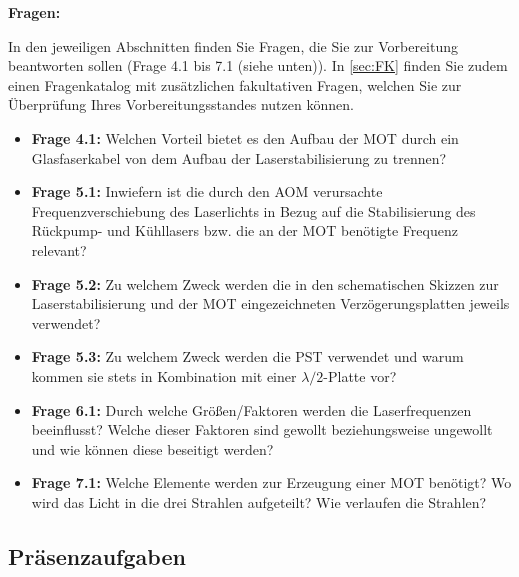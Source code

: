 \documentclass[
class=book,
accentcolor=1b,
custommargins=geometry,
fontsize=11pt,
thesis={type=Versuchsanleitung},
ruledheaders=all,
headline=false,
instbox=false,
marginpar=false,
title=small,
ignore-missing-data=true,
twoside=false,
logofile=apqdesign/tuda_logo.pdf,
pdfa=false %
]{apqpub}
\begin{document}
\textbf{Fragen:}  

In den jeweiligen Abschnitten finden Sie Fragen, die Sie zur Vorbereitung beantworten sollen (Frage 4.1 bis 7.1 (siehe unten)). In \autoref{sec:FK} finden Sie zudem einen Fragenkatalog mit zusätzlichen fakultativen Fragen, welchen Sie zur Überprüfung Ihres Vorbereitungsstandes nutzen können.

\begin{itemize}
	\item \textbf{Frage 4.1:} Welchen Vorteil bietet es den Aufbau der MOT durch ein Glasfaserkabel von dem Aufbau der Laserstabilisierung zu trennen?
	
	\item \textbf{Frage 5.1:} Inwiefern ist die durch den AOM verursachte Frequenzverschiebung des Laserlichts in Bezug auf die Stabilisierung des Rückpump- und Kühllasers bzw. die an der MOT benötigte Frequenz relevant?
	
	\item \textbf{Frage 5.2:} Zu welchem Zweck werden die in den schematischen Skizzen zur Laserstabilisierung und der MOT eingezeichneten Verzögerungsplatten jeweils verwendet?
	
	\item \textbf{Frage 5.3:} Zu welchem Zweck werden die PST verwendet und warum kommen sie stets in Kombination mit einer $\lambda/2$-Platte vor?  
	
	\item \textbf{Frage 6.1:} Durch welche Größen/Faktoren werden die Laserfrequenzen beeinflusst? Welche dieser Faktoren sind gewollt beziehungsweise ungewollt und wie können diese beseitigt werden?
	
	\item \textbf{Frage 7.1:} Welche Elemente werden zur Erzeugung einer MOT benötigt? Wo wird das Licht in die drei Strahlen aufgeteilt? Wie verlaufen die Strahlen?
\end{itemize}

\newpage

\subsection{Präsenzaufgaben}
\end{document}
